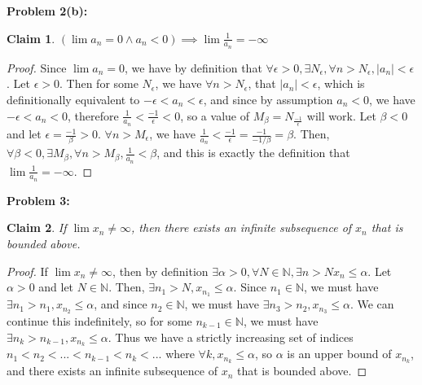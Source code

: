\documentclass{article}
\newcommand{\nats}{\ensuremath{\mathbb{N}}}
\newcommand{\eps}{\ensuremath{\epsilon}}
\newtheorem{clm}{Claim}
\begin{document}
\textbf{Problem 2(b):}

\begin{clm}
	$(\lim a_n = 0 \land a_n < 0) \implies \lim \frac{1}{a_n} = -\infty$
\end{clm}

\begin{proof}
	Since $\lim a_n = 0$,
	we have by definition that
	$\forall \eps > 0,
	\exists N_\eps,
	\forall n > N_\eps,
	|a_n| < \eps$.
	Let $\eps > 0$.
	Then for some $N_\eps$,
	we have $\forall n > N_\eps$,
	that $|a_n| < \eps$,
	which is definitionally equivalent
	to $-\eps < a_n < \eps$,
	and since by assumption $a_n < 0$,
	we have $-\eps < a_n < 0$,
	therefore $\frac{1}{a_n} < \frac{-1}{\eps} < 0$,
	so a value of $M_\beta = N_\frac{-1}{\eps}$ will work.
	Let $\beta < 0$
	and let $\eps = \frac{-1}{\beta} > 0$.
	$\forall n > M_\eps$,
	we have $\frac{1}{a_n} < \frac{-1}{\eps} = \frac{-1}{-1/\beta} = \beta$.
	Then,
	$\forall \beta < 0,
	\exists M_\beta,
	\forall n > M_\beta,
	\frac{1}{a_n} < \beta$,
	and this is exactly the definition that
	$\lim \frac{1}{a_n} = -\infty$.
\end{proof}

\textbf{Problem 3:}

\begin{clm}
	If $\lim x_n \neq \infty$,
	then there exists an infinite subsequence of $x_n$
	that is bounded above.
\end{clm}

\begin{proof}
	If $\lim x_n \neq \infty$,
	then by definition
	$\exists \alpha > 0, \forall N \in \nats, \exists n > N x_n \le \alpha$.
	Let $\alpha > 0$ and let $N \in \nats$.
	Then, $\exists n_1 > N, x_{n_1} \le \alpha$.
	Since $n_1 \in \nats$, we must have $\exists n_1 > n_1, x_{n_2} \le \alpha$,
	and since $n_2 \in \nats$, we must have $\exists n_3 > n_2, x_{n_3} \le \alpha$.
	We can continue this indefinitely,
	so for some $n_{k-1} \in \nats$, we must have $\exists n_k > n_{k-1}, x_{n_k} \le \alpha$.
	Thus we have a strictly increasing set of indices $n_1 < n_2 < ... < n_{k-1} < n_k < ...$
	where $\forall k, x_{n_k} \le \alpha$,
	so $\alpha$ is an upper bound of $x_{n_k}$,
	and there exists an infinite subsequence of $x_n$
	that is bounded above.
\end{proof}
\end{document}
